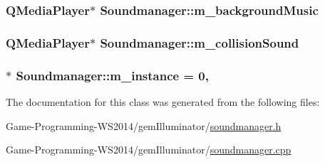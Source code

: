 \subsubsection[{m\+\_\+background\+Music}]{\setlength{\rightskip}{0pt plus 5cm}Q\+Media\+Player$\ast$ Soundmanager\+::m\+\_\+background\+Music\hspace{0.3cm}{\ttfamily [protected]}}\label{class_soundmanager_a39e32f7d94670486c52e78721a8f4faf}
\hypertarget{class_soundmanager_a824f9bfdbe61a7db3cb54cb87cb80268}{}
\subsubsection[{m\+\_\+collision\+Sound}]{\setlength{\rightskip}{0pt plus 5cm}Q\+Media\+Player$\ast$ Soundmanager\+::m\+\_\+collision\+Sound\hspace{0.3cm}{\ttfamily [protected]}}\label{class_soundmanager_a824f9bfdbe61a7db3cb54cb87cb80268}
\hypertarget{class_soundmanager_a81105bb352bada9ff056335df0dd2bb3}{}
\subsubsection[{m\+\_\+instance}]{ $\ast$ Soundmanager\+::m\+\_\+instance = 0\hspace{0.3cm}{\ttfamily [static]}, {\ttfamily [protected]}}\label{class_soundmanager_a81105bb352bada9ff056335df0dd2bb3}


The documentation for this class was generated from the following files\+:\begin{DoxyCompactItemize}
\item 
Game-\/\+Programming-\/\+W\+S2014/gem\+Illuminator/\hyperlink{soundmanager_8h}{soundmanager.\+h}\item 
Game-\/\+Programming-\/\+W\+S2014/gem\+Illuminator/\hyperlink{soundmanager_8cpp}{soundmanager.\+cpp}\end{DoxyCompactItemize}
